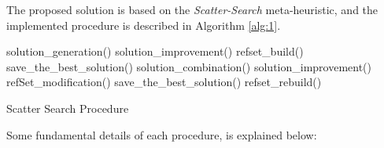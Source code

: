 The proposed solution is based on the \emph{Scatter-Search} meta-heuristic,
and the implemented procedure is described in Algorithm \ref{alg:1}.

\begin{scriptsize}
\begin{algorithm}[h!t]
    \begin{algorithmic}
        \STATE solution\_generation()
        \STATE solution\_improvement()
        \STATE refset\_build()
        \STATE save\_the\_best\_solution()
        \REPEAT
                \STATE solution\_combination()
                \STATE solution\_improvement()
                \STATE refSet\_modification()
            \ENDWHILE
            \STATE save\_the\_best\_solution()
            \STATE refset\_rebuild()
    \end{algorithmic}
    \caption{Scatter Search Procedure}
    \label{alg:1}
\end{algorithm}
\end{scriptsize}

Some fundamental details of each procedure,
is explained below:

